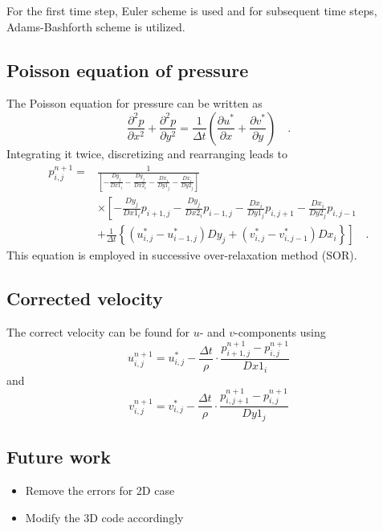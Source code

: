 \documentclass[12pt,a4paper,fleqn]{article}
\begin{document}
For the first time step, Euler scheme is used and for subsequent time steps, Adams-Bashforth scheme is utilized.

\subsection{Poisson equation of pressure}
The Poisson equation for pressure can be written as
\begin{equation} \label{eq:poisson-components}
\frac{\partial^2 p}{\partial x^2} + \frac{\partial^2 p}{\partial y^2}
= \frac{1}{\Delta t} \left(\frac{\partial u^*}{\partial x} + \frac{\partial v^*}{\partial y}\right) \quad .
\end{equation}
Integrating it twice, discretizing and rearranging leads to
\begin{align}
p_{i,j}^{n+1} =
&\frac{1}{\left[ - \frac{Dy_j}{Dx1_i} - \frac{Dy_j}{Dx2_i} - \frac{Dx_i}{Dy1_j} - \frac{Dx_i}{Dy2_j} \right]}
\nonumber \\
&\times
\left[
- \frac{Dy_j}{Dx1_i}p_{i+1,j} - \frac{Dy_j}{Dx2_i}p_{i-1,j} - \frac{Dx_i}{Dy1_j}p_{i,j+1} - \frac{Dx_i}{Dy2_j}p_{i,j-1}
\right. \nonumber \\
&\left.
+ \frac{1}{\Delta t}\left\{
\left(u^*_{i,j}-u^*_{i-1,j}\right)Dy_j
+ \left(v^*_{i,j}-v^*_{i,j-1}\right)Dx_i
\right\}
\right]
\quad .
\end{align}
This equation is employed in successive over-relaxation method (SOR).

\subsection{Corrected velocity}
The correct velocity can be found for $u$- and $v$-components using
\begin{equation}
u^{n+1}_{i,j} = u^*_{i,j} - \frac{\Delta t}{\rho}\cdot \frac{p_{i+1,j}^{n+1} - p_{i,j}^{n+1}}{Dx1_i}
\end{equation}
and
\begin{equation}
v^{n+1}_{i,j} = v^*_{i,j} - \frac{\Delta t}{\rho}\cdot \frac{p_{i,j+1}^{n+1} - p_{i,j}^{n+1}}{Dy1_j}
\end{equation}

\subsection{Future work}
\begin{itemize}
\item Remove the errors for 2D case
\item Modify the 3D code accordingly
\end{itemize}
\end{document}
